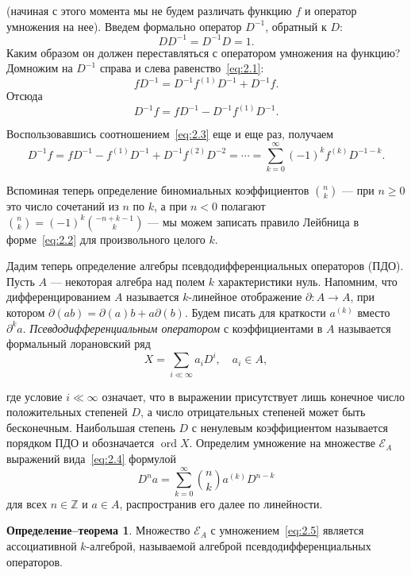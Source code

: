 \documentclass{article}
\theoremstyle{definition}
\theoremstyle{definition} %
\theoremstyle{remark}     %
\theoremstyle{definition}
\newtheorem{defthm}[definition]{Определение–теорема}
\theoremstyle{definition}
\theoremstyle{definition}
\theoremstyle{definition}
\theoremstyle{definition}
\theoremstyle{definition}
\theoremstyle{definition}
\theoremstyle{definition}
\begin{document}
(начиная с этого момента мы не будем различать функцию \(f\) и оператор умножения на нее). Введем формально оператор \(D^{-1}\), обратный к \(D\):
\[
DD^{-1} = D^{-1}D = 1.
\]
Каким образом он должен переставляться с оператором умножения на функцию? Домножим на \(D^{-1}\) справа и слева равенство~\ref{eq:2.1}:
\[
fD^{-1} = D^{-1}f^{(1)}D^{-1} + D^{-1}f.
\]
Отсюда
\begin{equation}\label{eq:2.3}
D^{-1}f = fD^{-1} - D^{-1}f^{(1)}D^{-1}.
\end{equation}

Воспользовавшись соотношением~\ref{eq:2.3} еще и еще раз, получаем
\[
D^{-1}f = fD^{-1} - f^{(1)}D^{-1} + D^{-1}f^{(2)}D^{-2} = \cdots = \sum_{k=0}^\infty (-1)^k f^{(k)}D^{-1-k}.
\]

Вспоминая теперь определение биномиальных коэффициентов \(\binom{n}{k}\) --- при \(n \ge 0\) это число сочетаний из \(n\) по \(k\), а при \(n < 0\) полагают \(\binom{n}{k} = (-1)^k \binom{-n+k-1}{k}\) --- мы можем записать правило Лейбница в форме~\ref{eq:2.2} для произвольного целого \(k\).

Дадим теперь определение алгебры псевдодифференциальных операторов (ПДО). Пусть \(A\) --- некоторая алгебра над полем \(k\) характеристики нуль. Напомним, что дифференцированием \(A\) называется \(k\)-линейное отображение \(\partial: A \to A\), при котором \(\partial(ab) = \partial(a)b + a\partial(b)\). Будем писать для краткости \(a^{(k)}\) вместо \(\partial^k a\). \emph{Псевдодифференциальным оператором} с коэффициентами в \(A\) называется формальный лорановский ряд
\begin{equation}\label{eq:2.4}
X = \sum_{i \ll \infty} a_i D^i, \quad a_i \in A,
\end{equation}



где условие \( i \ll \infty \) означает, что в выражении присутствует лишь конечное число положительных степеней \( D \), а число отрицательных степеней может быть бесконечным. Наибольшая степень \( D \) с ненулевым коэффициентом называется порядком ПДО и обозначается \(\operatorname{ord} X\). Определим умножение на множестве \( \mathcal{E}_A \) выражений вида~\ref{eq:2.4} формулой
\begin{equation}\label{eq:2.5}
D^n a = \sum_{k=0}^\infty \binom{n}{k} a^{(k)} D^{n-k}
\end{equation}
для всех \( n \in \mathbb{Z} \) и \( a \in A \), распространив его далее по линейности.

\begin{defthm}
 Множество \( \mathcal{E}_A \) с умножением~\ref{eq:2.5} является ассоциативной \( k \)-алгеброй, называемой алгеброй псевдодифференциальных операторов.
\end{defthm}
\end{document}
